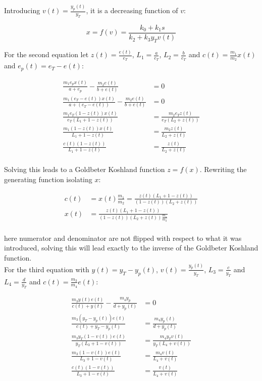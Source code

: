     Introducing $v(t) = \frac{y_p(t)}{y_T}$, it is a decreasing function of $v$:

    $$x = f(v) = \frac{k_0 + k_1s}{k_2 + k_3y_Tv(t)}$$

    For the second equation let $z(t) = \frac{e(t)}{e_T}$, $L_1 = \frac{a}{e_T}$, $L_2 = \frac{b}{e_T}$ and $c(t) = \frac{m_1}{m_2}x(t)$ and $e_p(t) = e_T- e(t)$:

    \begin{align*}
      \frac{m_1e_px(t)}{a + e_p} - \frac{m_2e(t)}{b + e(t)} &= 0\\
      \frac{m_1(e_T-e(t))x(t)}{a + (e_T-e(t))} - \frac{m_2e(t)}{b + e(t)} &= 0\\
      \frac{m_1e_T(1-z(t))x(t)}{e_T(L_1+1-z(t))} &= \frac{m_2e_Tz(t)}{e_T(L_2 + z(t))}\\
      \frac{m_1(1-z(t))x(t)}{L_1 + 1-z(t)} &= \frac{m_2z(t)}{L_2 + z(t)}\\
      \frac{c(t)(1-z(t))}{L_1+1-z(t)} &= \frac{z(t)}{L_2 + z(t)}\\
    \end{align*}

    Solving this leads to a Goldbeter Koshland function $z = f(x)$.
    Rewriting the generating function isolating $x$:

    \begin{align*}
      c(t) &= x(t) \frac{m_1}{m_2} = \frac{z(t)(L_1+1-z(t))}{(1-z(t))(L_2+z(t))}\\
      x(t) &= \frac{z(t)(L_1+1-z(t))}{(1-z(t))(L_2+z(t))\frac{m_1}{m_2}}\\
    \end{align*}

    here numerator and denominator are not flipped with respect to what it was introduced, solving this will lead exactly to the inverse of the Goldbeter Koshland function.\\
    For the third equation with $y(t) = y_T-y_p(t)$, $v(t) = \frac{y_p(t)}{y_T}$, $L_3 = \frac{c}{y_T}$ and $L_4 = \frac{d}{y_T}$ and $c(t) = \frac{m_3}{m_4}e(t)$:

    \begin{align*}
      \frac{m_3y(t)e(t)}{c(t) + y(t)} - \frac{m_4y_p}{d + y_p(t)} &= 0\\
      \frac{m_3(y_T-y_p(t))e(t)}{c(t) + y_T-y_p(t)} &= \frac{m_4y_p(t)}{d + y_p(t)}\\
      \frac{m_3y_T(1-v(t))e(t)}{y_T(L_3+1-v(t))} &= \frac{m_4y_Tv(t)}{y_T(L_4 + v(t))}\\
      \frac{m_3(1-v(t))e(t)}{L_3+1-v(t)} &= \frac{m_4v(t)}{L_4 + v(t)}\\
      \frac{c(t)(1-v(t))}{L_3+1-v(t)} &= \frac{v(t)}{L_4 + v(t)}\\
    \end{align*}

